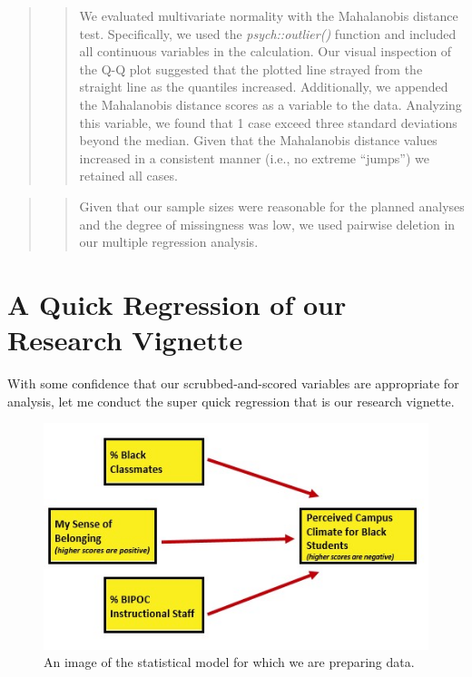 \documentclass[
  11pt,
]{book}
\begin{document}
\begin{quote}
\begin{quote}
We evaluated multivariate normality with the Mahalanobis distance test. Specifically, we used the \emph{psych::outlier()} function and included all continuous variables in the calculation. Our visual inspection of the Q-Q plot suggested that the plotted line strayed from the straight line as the quantiles increased. Additionally, we appended the Mahalanobis distance scores as a variable to the data. Analyzing this variable, we found that 1 case exceed three standard deviations beyond the median. Given that the Mahalanobis distance values increased in a consistent manner (i.e., no extreme ``jumps'') we retained all cases.
\end{quote}
\end{quote}

\begin{quote}
\begin{quote}
Given that our sample sizes were reasonable for the planned analyses and the degree of missingness was low, we used pairwise deletion in our multiple regression analysis.
\end{quote}
\end{quote}

\hypertarget{a-quick-regression-of-our-research-vignette}{%
\section{A Quick Regression of our Research Vignette}\label{a-quick-regression-of-our-research-vignette}}

With some confidence that our scrubbed-and-scored variables are appropriate for analysis, let me conduct the super quick regression that is our research vignette.

\begin{figure}
\centering
\includegraphics{images/Ch04/BlStuRegression.jpg}
\caption{An image of the statistical model for which we are preparing data.}
\end{figure}
\end{document}
